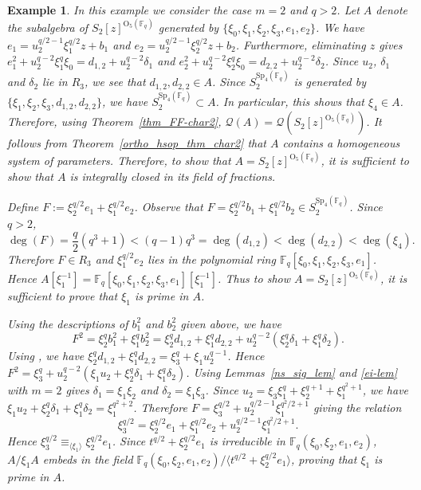 \documentclass{amsart}
\newtheorem{example}[subsection]{Example}
\newcommand{\field}{\mathbb{F}}
\newcommand{\syp}[2]{{{\text{Sp}_{{#1}}(\field_{#2})}}}
\newcommand{\orth}[2]{{{\text{O}_{{#1}}(\field_{#2})}}}
\newcommand{\FF}{\mathcal{Q}}
\begin{document}
\begin{example} In this example we consider the case $m=2$ and $q>2$. Let $A$ denote the subalgebra of $S_2[z]^{\orth{5}{q}}$ generated by
$\{\xi_0,\xi_1,\xi_2,\xi_3,e_1,e_2\}$. 
We have $e_1=u_2^{q/2-1}\xi_1^{q/2}z+b_1$ and $e_2=u_2^{q/2-1}\xi_2^{q/2}z+b_2$.
Furthermore, eliminating $z$ gives 
$e_1^2+u_2^{q-2}\xi_1^{q}\xi_0=d_{1,2}+u_2^{q-2}\delta_1$  and
$e_2^2+u_2^{q-2}\xi_2^q\xi_0=d_{2,2}+u_2^{q-2}\delta_2$.
Since $u_2$, $\delta_1$ and $\delta_2$ lie in $R_3$, we see that $d_{1,2},d_{2,2}\in A$. 
Since $S_2^{\syp{4}{q}}$ is generated by $\{\xi_1,\xi_2,\xi_3,d_{1,2},d_{2,2}\}$, we have
$S_2^{\syp{4}{q}}\subset A$. In particular, this shows that $\xi_4\in A$.
Therefore, using Theorem~\ref{thm_FF-char2}, $\FF(A)=\FF(S_2[z]^{\orth{5}{q}})$.
It follows from Theorem~\ref{ortho_hsop_thm_char2} that $A$ contains a homogeneous system of parameters.
Therefore, to show that $A=S_2[z]^{\orth{5}{q}}$, it is sufficient to show that $A$ is integrally closed in its field of fractions.

Define $F:=\xi_2^{q/2}e_1+\xi_1^{q/2}e_2$. 
Observe that $F=\xi_2^{q/2}b_1+\xi_1^{q/2}b_2\in S_2^{\syp{4}{q}}$.
Since $q>2$, 
$$\deg(F)=\frac{q}{2}(q^3+1)<(q-1)q^3=\deg(d_{1,2})<\deg(d_{2,2})<\deg(\xi_4).$$
Therefore $F\in R_3$ and $\xi_1^{q/2}e_2$ lies in the polynomial ring $\field_q[\xi_0,\xi_1,\xi_2,\xi_3,e_1]$.
Hence $A[\xi_1^{-1}]=\field_q[\xi_0,\xi_1,\xi_2,\xi_3,e_1][\xi_1^{-1}]$. 
Thus to show $A=S_2[z]^{\orth{5}{q}}$, it is sufficient to prove that $\xi_1$ is prime in $A$.

Using the  descriptions of $b_1^2$ and $b_2^2$ given above,
we have $$F^2=\xi_2^q b_1^2+\xi_1^q b_2^2=\xi_2^q d_{1,2}+\xi_1^q d_{2,2}+u_2^{ q-2}(\xi_2^q \delta_1 +\xi_1^q\delta_2).$$
Using \cite[Theorem 8.3.11]{benson-polyinvafinigrou:93}, we have 
$\xi_2^q d_{1,2}+\xi_1^q d_{2,2}=\xi_3^q+\xi_1u_2^{q-1}$.
Hence $F^2=\xi_3^q+u_2^{ q-2}(\xi_1u_2+\xi_2^q \delta_1 +\xi_1^q\delta_2)$.
Using Lemmas~\ref{ns_sig_lem} and \ref{ei-lem} with $m=2$ gives $\delta_1=\xi_1\xi_2$
and $\delta_2=\xi_1\xi_3$. Since $u_2=\xi_3\xi_1^q+\xi_2^{q+1}+\xi_1^{q^2+1}$,
we have $\xi_1u_2+\xi_2^q \delta_1 +\xi_1^q\delta_2=\xi_1^{q^2+2}$.
Therefore $F=\xi_3^{q/2}+u_2^{q/2-1}\xi_1^{q^2/2+1}$ giving the relation
$$\xi_3^{q/2}=\xi_2^{q/2}e_1+\xi_1^{q/2}e_2+u_2^{q/2-1}\xi_1^{q^2/2+1}.$$
Hence $\xi_3^{q/2}\equiv_{\langle \xi_1\rangle}\xi_2^{q/2}e_1$.
Since $t^{q/2}+\xi_2^{q/2}e_1$ is irreducible in $\field_q(\xi_0,\xi_2,e_1,e_2)$,
$A/\xi_1A$ embeds in the field $\field_q(\xi_0,\xi_2,e_1,e_2)/\langle t^{q/2}+\xi_2^{q/2}e_1\rangle$,
proving that $\xi_1$ is prime in $A$.
\end{example}
\end{document}
